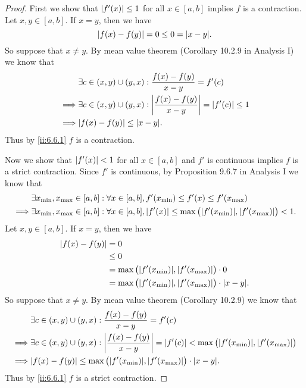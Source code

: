 \begin{proof}
  First we show that \(\left\lvert f'(x)\right\rvert \leq 1\) for all \(x \in [a, b]\) implies \(f\) is a contraction.
  Let \(x, y \in [a, b]\).
  If \(x = y\), then we have
  \[
    \abs{f(x) - f(y)} = 0 \leq 0 = \abs{x - y}.
  \]
  So suppose that \(x \neq y\).
  By mean value theorem (Corollary 10.2.9 in Analysis I) we know that
  \begin{align*}
             & \exists c \in (x, y) \cup (y, x) : \dfrac{f(x) - f(y)}{x - y} = f'(c)                    \\
    \implies & \exists c \in (x, y) \cup (y, x) : \abs{\dfrac{f(x) - f(y)}{x - y}} = \abs{f'(c)} \leq 1 \\
    \implies & \abs{f(x) - f(y)} \leq \abs{x - y}.
  \end{align*}
  Thus by \cref{ii:6.6.1} \(f\) is a contraction.

  Now we show that \(\left\lvert f'(x)\right\rvert < 1\) for all \(x \in [a, b]\) and \(f'\) is continuous implies \(f\) is a strict contraction.
  Since \(f'\) is continuous, by Proposition 9.6.7 in Analysis I we know that
  \begin{align*}
             & \exists x_{\min}, x_{\max} \in [a, b] : \forall x \in [a, b], f'(x_{\min}) \leq f'(x) \leq f'(x_{\max})                                  \\
    \implies & \exists x_{\min}, x_{\max} \in [a, b] : \forall x \in [a, b], \abs{f'(x)} \leq \max\big(\abs{f'(x_{\min})}, \abs{f'(x_{\max})}\big) < 1.
  \end{align*}
  Let \(x, y \in [a, b]\).
  If \(x = y\), then we have
  \begin{align*}
    \abs{f(x) - f(y)} & = 0                                                                       \\
                      & \leq 0                                                                    \\
                      & = \max\big(\abs{f'(x_{\min})}, \abs{f'(x_{\max})}\big) \cdot 0            \\
                      & = \max\big(\abs{f'(x_{\min})}, \abs{f'(x_{\max})}\big) \cdot \abs{x - y}.
  \end{align*}
  So suppose that \(x \neq y\).
  By mean value theorem (Corollary 10.2.9) we know that
  \begin{align*}
             & \exists c \in (x, y) \cup (y, x) : \dfrac{f(x) - f(y)}{x - y} = f'(c)                                                                    \\
    \implies & \exists c \in (x, y) \cup (y, x) : \abs{\dfrac{f(x) - f(y)}{x - y}} = \abs{f'(c)} < \max\big(\abs{f'(x_{\min})}, \abs{f'(x_{\max})}\big) \\
    \implies & \abs{f(x) - f(y)} \leq \max\big(\abs{f'(x_{\min})}, \abs{f'(x_{\max})}\big) \cdot \abs{x - y}.
  \end{align*}
  Thus by \cref{ii:6.6.1} \(f\) is a strict contraction.
\end{proof}

